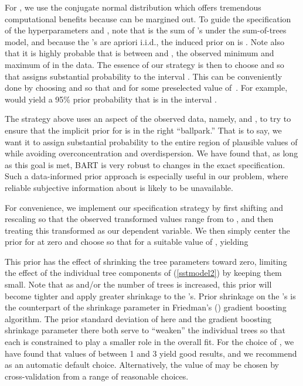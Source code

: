 \documentclass[aoas,nameyear,dvips]{arximspdf}
\begin{document}
For , we use the conjugate normal distribution
 which offers tremendous computational
benefits because  can be margined out.  To guide the
specification of the hyperparameters  and , note
that  is the sum of  's under the sum-of-trees
model, and because the 's are apriori i.i.d., the induced
prior on  is . Note also that
it is highly probable that  is between  and
, the observed minimum and maximum of  in the data. The
essence of our strategy is then to choose  and  so
that  assigns substantial probability
to the interval .  This can be conveniently done
by choosing  and  so that  and  for some preselected value of~. For example,
 would yield a 95\% prior probability that  is in the
interval .

The strategy above uses an aspect of the observed data, namely,  and , to
try to ensure that the implicit prior for  is in the right ``ballpark.''
That is to say, we want it to assign substantial probability to the entire region of
plausible values of  while avoiding overconcentration and overdispersion.
We have found that, as long as this goal is met, BART is very robust to changes in the exact specification.
Such a data-informed prior approach is especially useful in our problem,  where reliable subjective information about  is likely to be unavailable.


For convenience, we implement our specification strategy by first shifting and rescaling
 so that the observed transformed  values range from   to ,
and then treating this transformed  as our dependent variable.
We then simply center the prior for  at zero  and choose  so that
 for
a suitable value of ,  yielding


This prior has the effect of shrinking the tree parameters
 toward zero, limiting the effect of the individual
tree components of (\ref{sstmodel2}) by keeping them small.  Note
that as  and/or the number of trees  is increased, this
prior will become tighter and apply greater shrinkage to the
's.  Prior shrinkage on the 's is the
counterpart of the shrinkage parameter in
Friedman's (\citeyear{Fri2001}) gradient boosting algorithm.  The prior
standard deviation  of   here and the gradient
boosting shrinkage parameter there both serve to ``weaken'' the
individual trees so that each is constrained to play a smaller
role in the overall fit.  For the choice of , we have found
that values of  between 1 and 3 yield good results, and we
recommend  as an automatic default choice. Alternatively,
the value of  may be chosen by cross-validation from a range of
reasonable choices.
\end{document}

